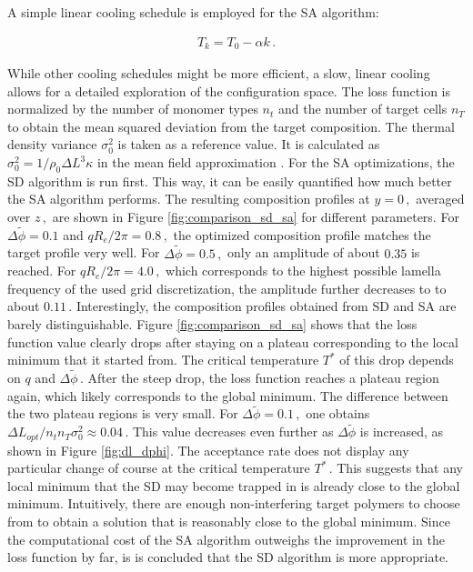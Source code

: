 \documentclass[bachelor,       %
               twoside,        %
               BCOR10mm,       %
               ngerman, english %
               ]{GAUBM}
\begin{document}
A simple linear cooling schedule is employed for the \ac{SA} algorithm:

\begin{align}
    T_k=T_0-\alpha k\,.
\end{align}

While other cooling schedules might be more efficient, a slow, linear cooling allows for a detailed exploration of the configuration space. The loss function is normalized by the number of monomer types $n_t$ and the number of target cells $n_T$ to obtain the mean squared deviation from the target composition. The thermal density variance $\sigma_0^2$ is taken as a reference value. It is calculated as $\sigma_0^2=1/\rho_0\Delta L^3\kappa$ in the mean field approximation \cite{Daoulas06}. For the \ac{SA} optimizations, the \ac{SD} algorithm is run first. This way, it can be easily quantified how much better the \ac{SA} algorithm performs. The resulting composition profiles at $y=0\,,$ averaged over $z\,,$ are shown in Figure \ref{fig:comparison_sd_sa} for different parameters. For $\Delta\tilde\phi=0.1$ and $qR_e/2\pi=0.8\,,$ the optimized composition profile matches the target profile very well. For $\Delta\tilde\phi=0.5\,,$ only an amplitude of about $0.35$ is reached. For  $qR_e/2\pi=4.0\,,$ which corresponds to the highest possible lamella frequency of the used grid discretization, the amplitude further decreases to to about $0.11\,.$ Interestingly, the composition profiles obtained from \ac{SD} and \ac{SA} are barely distinguishable. Figure \ref{fig:comparison_sd_sa} shows that the loss function value clearly drops after staying on a plateau corresponding to the local minimum that it started from. The critical temperature $T^*$ of this drop depends on $q$ and $\Delta\tilde\phi\,.$ After the steep drop, the loss function reaches a plateau region again, which likely corresponds to the global minimum. The difference between the two plateau regions is very small. For $\Delta\tilde\phi=0.1\,,$ one obtains $\Delta L_{opt}/n_tn_T\sigma_0^2\approx 0.04\,.$ This value decreases even further as $\Delta\tilde\phi$ is increased, as shown in Figure \ref{fig:dl_dphi}. The acceptance rate does not display any particular change of course at the critical temperature $T^*\,.$ This suggests that any local minimum that the \ac{SD} may become trapped in is already close to the global minimum. Intuitively, there are enough non-interfering target polymers to choose from to obtain a solution that is reasonably close to the global minimum. Since the computational cost of the \ac{SA} algorithm outweighs the improvement in the loss function by far, is is concluded that the \ac{SD} algorithm is more appropriate.
\end{document}
